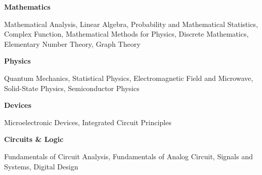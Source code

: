 
\newcommand{\levelentry}[1]{\item \textbf{#1}}
\newenvironment{cvcourses}
{
    \begin{cvlist}\item
    \small
}
{
    \normalsize
    \end{cvlist}
}

\begin{cvlist}
    \levelentry{Mathematics}
    \begin{cvcourses}
        Mathematical Analysis, Linear Algebra, Probability and Mathematical Statistics,
        Complex Function, Mathematical Methods for Physics,
        Discrete Mathematics, Elementary Number Theory, Graph Theory
    \end{cvcourses}

    \levelentry{Physics}
    \begin{cvcourses}
        Quantum Mechanics, Statistical Physics, Electromagnetic Field and Microwave,
        Solid-State Physics, Semiconductor Physics
    \end{cvcourses}
    
    \levelentry{Devices}
    \begin{cvcourses}
        Microelectronic Devices, Integrated Circuit Principles
    \end{cvcourses}



    \levelentry{Circuits \& Logic}
    \begin{cvcourses}
        Fundamentals of Circuit Analysis, Fundamentals of Analog Circuit, Signals and Systems, Digital Design
    \end{cvcourses}


\end{cvlist}
